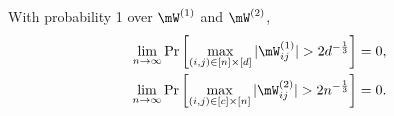 \begin{corollary}
\label{cor:w-not-too-large}
With probability 1 over $\mW^{(1)}$ and $\mW^{(2)}$,
\begin{equation}
\begin{split}
    \lim_{n\to\infty}\Pr\left[\max_{(i,j)\in[n]\times[d]}|\mW^{(1)}_{ij}| > 2d^{-\frac13}\right] &= 0,\\
    \lim_{n\to\infty}\Pr\left[\max_{(i,j)\in[c]\times[n]}|\mW^{(2)}_{ij}| > 2n^{-\frac13}\right] &= 0.\\
\end{split}
\end{equation}
\end{corollary}
